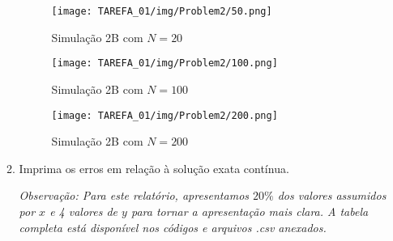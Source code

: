 \documentclass[column,amsmath,amssymb,floatfix]{revtex4}
\begin{document}
\begin{enumerate}
\begin{enumerate}
                    \begin{figure}[H]
                    \centering
                    \begin{minipage}{0.32\textwidth}
                        \centering
                        \texttt{[image: TAREFA\_01/img/Problem2/50.png]}
                        \caption{Simulação 2B com $N = 20$}
                    \end{minipage}
                    \hfill
                    \begin{minipage}{0.32\textwidth}
                        \centering
                        \texttt{[image: TAREFA\_01/img/Problem2/100.png]}
                        \caption{Simulação 2B com $N = 100$}
                    \end{minipage}
                    \hfill
                    \begin{minipage}{0.32\textwidth}
                        \centering
                        \texttt{[image: TAREFA\_01/img/Problem2/200.png]}
                        \caption{Simulação 2B com $N = 200$}
                    \end{minipage}
                \end{figure}
                
                \item Imprima os erros em relação à solução exata contínua.

                \textit{Observação: Para este relatório, apresentamos $20\%$ dos valores assumidos por $x$ e 4 valores de $y$ para tornar a apresentação mais clara. A tabela completa está disponível nos códigos e arquivos \textit{.csv} anexados.}


\end{enumerate}
\end{enumerate}
\end{document}
